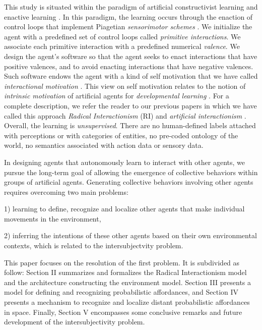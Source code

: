 \documentclass[conference]{IEEEtran}
\begin{document}
This study is situated within the paradigm of artificial constructivist learning \cite{wang_new_2012} and enactive learning \cite{froese2009enactiveAI}. 
In this paradigm, the learning occurs through the enaction of control loops that implement Piagetian \textit{sensorimotor schemes} \cite{piaget2013construction}.  
We initialize the agent with a predefined set of control loops called \textit{primitive interactions}. 
We associate each primitive interaction with a predefined numerical \textit{valence}.
We design the agent's software so that the agent seeks to enact interactions that have positive valences, and to avoid enacting interactions that have negative valences. 
Such software endows the agent with a kind of self motivation that we have called \textit{interactional motivation} \cite{georgeon_interactional_2012}.
This view on self motivation relates to the notion of \textit{intrinsic motivation} of artificial agents for \textit{developmental learning} \cite[e.g.]{oudeyer_intrinsic_2007}.
For a complete description, we refer the reader to our previous papers in which we have called this approach \textit{Radical Interactionism} (RI) \cite{georgeon:radical} and \textit{artificial interactionism} \cite{GuillerminGeorgeon2022}. 
Overall, the learning is \textit{unsupervised}. 
There are no human-defined labels attached with perceptions or with categories of entities, no pre-coded ontology of the world, no semantics associated with action data or sensory data.  


In designing agents that autonomously learn to interact with other agents, we pursue the long-term goal of allowing the emergence of collective behaviors within groups of artificial agents. Generating collective behaviors involving other agents requires overcoming two main problems:

1) learning to define, recognize and localize other agents that make individual movements in the environment,

2) inferring the intentions of these other agents based on their own environmental contexts, which is related to the intersubjectvity problem.

This paper focuses on the resolution of the first problem. 
It is subdivided as follow: Section II summarizes and formalizes the Radical Interactionism model and the architecture constructing the environment model. Section III presents a model for defining and recognizing probabilistic affordances, and Section IV presents a mechanism to recognize and localize distant probabilistic affordances in space. Finally, Section V encompasses some conclusive remarks and future development of the intersubjectivity problem.
\end{document}
